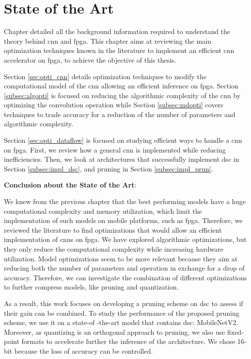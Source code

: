 \chapter{State of the Art} \label{chap:sota}
Chapter  detailed all the background information required to understand the theory behind \acrshort{cnn} and \acrshort{fpga}. This chapter aims at reviewing the main optimization techniques known in the literature to implement an efficient \acrshort{cnn} accelerator on \acrshort{fpga}, to achieve the objective of this thesis.

Section \ref{sec:opti_cnn} details optimization techniques to modify the computational model of the \acrshort{cnn} allowing an efficient inference on \acrshort{fpga}. Section \ref{subsec:algopti} is focused on reducing the algorithmic complexity of the \acrshort{cnn} by optimizing the convolution operation while Section \ref{subsec:mdopti} covers techniques to trade accuracy for a reduction of the number of parameters and algorithmic complexity.

Section \ref{sec:opti_dataflow} is focused on studying efficient ways to handle a \acrshort{cnn} on \acrshort{fpga}. First, we review how a general \acrshort{cnn} is implemented while reducing inefficiencies. Then, we look at architectures that successfully implement \acrshort{dsc} in Section \ref{subsec:impl_dsc}, and pruning in Section \ref{subsec:impl_prun}.

%

%
\begin{tcolorbox}
    \textbf{Conclusion about the State of the Art}: \newline \newline

    We knew from the previous chapter that the best performing models have a huge computational complexity and memory utilization, which limit the implementation of such models on mobile platforms, such as \acrshort{fpga}. Therefore, we reviewed the literature to find optimizations that would allow an efficient implementation of \acrshort{cnn}s on \acrshort{fpga}. We have explored algorithmic optimizations, but they only reduce the computational complexity while increasing hardware utilization. Model optimizations seem to be more relevant because they aim at reducing both the number of parameters and operation in exchange for a drop of accuracy. Therefore, we can investigate the combination of different optimizations to further compress models, like pruning and quantization. \newline \newline
    
    As a result, this work focuses on developing a pruning scheme on \acrshort{dsc} to assess if their gain can be combined. To study the performance of the proposed pruning scheme, we use it on a state-of -the-art model that contains \acrshort{dsc}: MobileNetV2. Moreover, as quantizing is an orthogonal approach to pruning, we also use fixed-point formats to accelerate further the inference of the architecture. We chose 16-bit because the loss of accuracy can be controlled.
\end{tcolorbox}
\newpage
